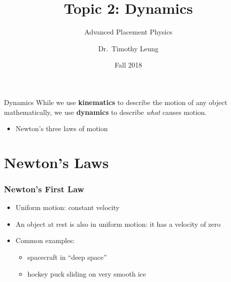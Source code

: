 \documentclass[12pt,compress,aspectratio=169]{beamer}
\title{Topic 2: Dynamics}
\subtitle{Advanced Placement Physics}
\author[TML]{Dr.\ Timothy Leung}
\institute{Olympiads School}
\date{Fall 2018}
\begin{document}
\begin{frame}
  \maketitle
\end{frame}

\begin{frame}{Dynamics}
  While we use \textbf{kinematics} to describe the motion of any object
  mathematically, we use \textbf{dynamics} to describe \emph{what} causes
  motion.
  \begin{itemize}
  \item Newton's three laws of motion
  \end{itemize}
\end{frame}



\section{Newton's Laws}

\begin{frame}
  \frametitle{Newton's First Law}
  \begin{center}
  \end{center}

  \vspace{.3in}
  \begin{itemize}
  \item Uniform motion: constant velocity
  \item An object at rest is also in uniform motion: it has a velocity of zero
  \item Common examples:
    \begin{itemize}
    \item spacecraft in ``deep space''
    \item hockey puck sliding on very smooth ice
    \end{itemize}
  \end{itemize}
\end{frame}
\end{document}
